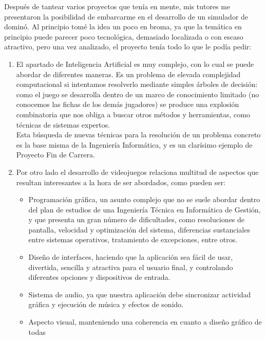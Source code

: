 Después de tantear varios proyectos que tenía en mente, mis tutores me presentaron la posibilidad
de embarcarme en el desarrollo de un simulador de dominó. Al principio tomé la idea un poco en broma,
ya que la temática en principio puede parecer poco tecnológica, demasiado localizada o con escaso
atractivo, pero una vez analizado, el proyecto tenía todo lo que le podía pedir:
\begin{enumerate}
    \item El apartado de Inteligencia Artificial es muy complejo, con lo cual se puede abordar de
            diferentes maneras. Es un
            problema de elevada complejidad computacional si intentamos resolverlo mediante simples
            árboles de decisión: como el juego se desarrolla dentro de un marco de conocimiento
            limitado (no conocemos las fichas de los demás jugadores) se produce una explosión
            combinatoria que nos obliga a buscar otros métodos y herramientas, como técnicas de sistemas expertos.\\
            Esta búsqueda de nuevas técnicas para la resolución de un problema concreto es la base
            misma de la Ingeniería Informática, y es un clarísimo ejemplo de Proyecto Fin de Carrera.
    \item Por otro lado el desarrollo de videojuegos relaciona multitud de aspectos que resultan
            interesantes a la hora de ser abordados, como pueden ser:
            \begin{itemize}
                \item Programación gráfica, un asunto complejo que no se suele abordar dentro del
                        plan de estudios de una Ingeniería Técnica en Informática de Gestión, y que
                        presenta un gran número de dificultades, como resoluciones de pantalla, velocidad
                        y optimización del sistema, diferencias sustanciales entre sistemas operativos,
                        tratamiento de excepciones, entre otros.
                \item Diseño de interfaces, haciendo que la aplicación sea fácil de usar, divertida,
                        sencilla y atractiva para el usuario final, y controlando diferentes opciones
                        y dispositivos de entrada.
                \item Sistema de audio, ya que nuestra aplicación debe sincronizar actividad gráfica y
                        ejecución de música y efectos de sonido.
                \item Aspecto visual, manteniendo una coherencia en cuanto a diseño gráfico de todas

\end{itemize}
\end{enumerate}
